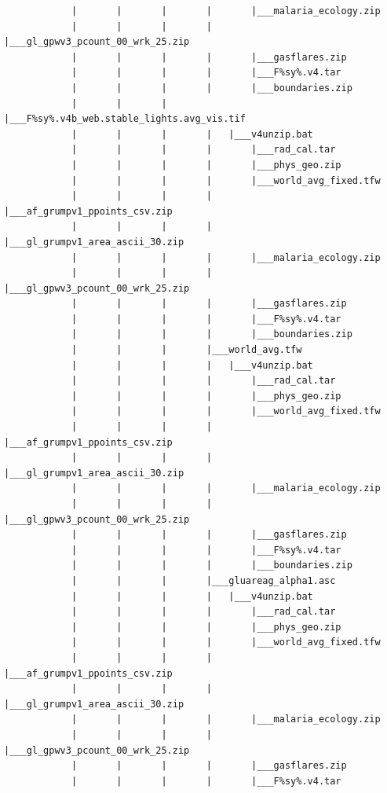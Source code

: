 \documentclass[
]{book}
\begin{document}
\begin{verbatim}
            |       |       |       |       |___malaria_ecology.zip
            |       |       |       |       |___gl_gpwv3_pcount_00_wrk_25.zip
            |       |       |       |       |___gasflares.zip
            |       |       |       |       |___F%sy%.v4.tar
            |       |       |       |       |___boundaries.zip
            |       |       |       |___F%sy%.v4b_web.stable_lights.avg_vis.tif
            |       |       |       |   |___v4unzip.bat
            |       |       |       |       |___rad_cal.tar
            |       |       |       |       |___phys_geo.zip
            |       |       |       |       |___world_avg_fixed.tfw
            |       |       |       |       |___af_grumpv1_ppoints_csv.zip
            |       |       |       |       |___gl_grumpv1_area_ascii_30.zip
            |       |       |       |       |___malaria_ecology.zip
            |       |       |       |       |___gl_gpwv3_pcount_00_wrk_25.zip
            |       |       |       |       |___gasflares.zip
            |       |       |       |       |___F%sy%.v4.tar
            |       |       |       |       |___boundaries.zip
            |       |       |       |___world_avg.tfw
            |       |       |       |   |___v4unzip.bat
            |       |       |       |       |___rad_cal.tar
            |       |       |       |       |___phys_geo.zip
            |       |       |       |       |___world_avg_fixed.tfw
            |       |       |       |       |___af_grumpv1_ppoints_csv.zip
            |       |       |       |       |___gl_grumpv1_area_ascii_30.zip
            |       |       |       |       |___malaria_ecology.zip
            |       |       |       |       |___gl_gpwv3_pcount_00_wrk_25.zip
            |       |       |       |       |___gasflares.zip
            |       |       |       |       |___F%sy%.v4.tar
            |       |       |       |       |___boundaries.zip
            |       |       |       |___gluareag_alpha1.asc
            |       |       |       |   |___v4unzip.bat
            |       |       |       |       |___rad_cal.tar
            |       |       |       |       |___phys_geo.zip
            |       |       |       |       |___world_avg_fixed.tfw
            |       |       |       |       |___af_grumpv1_ppoints_csv.zip
            |       |       |       |       |___gl_grumpv1_area_ascii_30.zip
            |       |       |       |       |___malaria_ecology.zip
            |       |       |       |       |___gl_gpwv3_pcount_00_wrk_25.zip
            |       |       |       |       |___gasflares.zip
            |       |       |       |       |___F%sy%.v4.tar

\end{verbatim}
\end{document}
